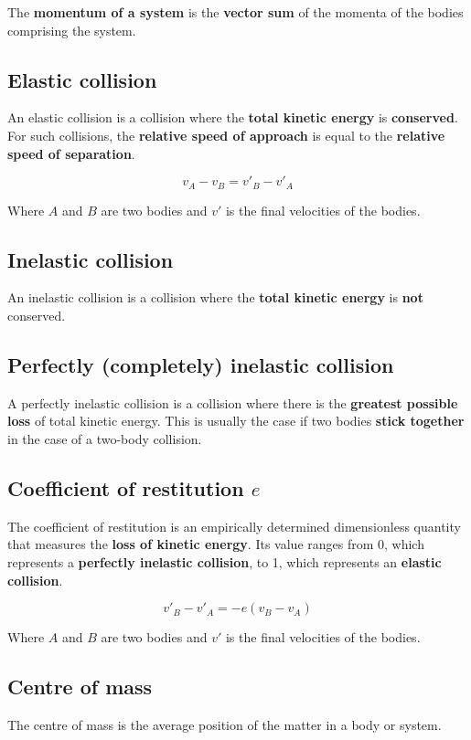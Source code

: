 \documentclass[11pt]{article}
\begin{document}
The \textbf{momentum of a system} is the \textbf{vector sum} of the momenta of the bodies comprising the system.

\subsection{Elastic collision}
\label{sec:orgddfc17d}
An elastic collision is a collision where the \textbf{total kinetic energy} is \textbf{conserved}.
\\[0pt]

For such collisions, the \textbf{relative speed of approach} is equal to the \textbf{relative speed of separation}.

\[v_A - v_B = v'_B - v'_A\]

Where \(A\) and \(B\) are two bodies and \(v'\) is the final velocities of the bodies.

\subsection{Inelastic collision}
\label{sec:org5b0dc57}
An inelastic collision is a collision where the \textbf{total kinetic energy} is \textbf{not} conserved.

\subsection{Perfectly (completely) inelastic collision}
\label{sec:org8a993e4}
A perfectly inelastic collision is a collision where there is the \textbf{greatest possible loss} of total kinetic energy. This is usually the case if two bodies \textbf{stick together} in the case of a two-body collision.

\subsection{Coefficient of restitution \(e\)}
\label{sec:org26cc231}
The coefficient of restitution is an empirically determined dimensionless quantity that measures the \textbf{loss of kinetic energy}. Its value ranges from 0, which represents a \textbf{perfectly inelastic collision}, to 1, which represents an \textbf{elastic collision}.

\[v'_B - v'_A = - e(v_B - v_A)\]

Where \(A\) and \(B\) are two bodies and \(v'\) is the final velocities of the bodies.

\newpage

\subsection{Centre of mass}
\label{sec:orgdb65dce}
The centre of mass is the average position of the matter in a body or system.
\end{document}
